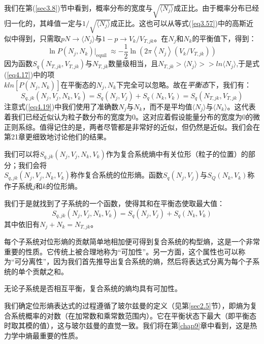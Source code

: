 \documentclass[UTF8]{ctexart}
\numberwithin{equation}{section}%
\numberwithin{figure}{section}%
\begin{document}
    我们在第(\ref{sec3.8})节中看到，概率分布的宽度与$\sqrt{\langle{N_j}\rangle}$成正比。由于概率分布已经归一化的，其峰值一定与$1/\sqrt{\langle{N_j}\rangle}$成正比。这也可以从等式(\ref{eq3.57})中的高斯近似中得到，只需取$pN\rightarrow\langle{N_j}\rangle$与$1-p\rightarrow V_k/V_{T,jk}$。在$N_j$和$N_k$的平衡值下，得到：
    \begin{equation}
        \ln P\left(N_{j}, N_{k}\right)|_{\text {equil }} \approx-\frac{1}{2} \ln \left(2 \pi\left\langle N_{j}\right\rangle\left(V_{k} / V_{T, j k}\right)\right)
    \end{equation}
    因为函数$S_q(N_{T,jk},V_{T,jk})$与$N_{T,jk}$数量级相当，且$N_{T,jk}>\langle{N_j}\rangle>>ln\langle{N_j}\rangle$,于是式(\ref{eq4.17})中的项\\$kln[P(N_j,N_k)]$在平衡态的$N_j,N_k$下完全可以忽略。故在\textit{平衡态}下，我们有：
    \begin{equation}\label{eq4.19}
        S_{q, j k}\left(N_{j}, V_{j}, N_{k}, V_{k}\right)=S_{q}\left(N_{j}, V_{j}\right)+S_{q}\left(N_{k}, V_{k}\right)=S_{q}\left(N_{T, j k}, V_{T, j k}\right)
    \end{equation}
    注意式(\ref{eq4.19})中我们使用了准确数$N_j$与$N_k$，而不是平均值$\langle{N_j}\rangle$与$\langle{N_k}\rangle$。这代表着我们已经近似认为粒子数分布的宽度为0。这对应着假设能量分布的宽度为0的微正则系综。值得记住的是，两者尽管都是非常好的近似，但仍然是近似。我们会在第21章更细致地讨论他们的结果。

    我们可以将$S_{q, j k}\left(N_{j}, V_{j}, N_{k}, V_{k}\right)$作为复合系统熵中有关位形（粒子的位置）的部分；我们会将\\$S_{q, j k}\left(N_{j}, V_{j}, N_{k}, V_{k}\right)$称作复合系统的位形熵。函数$S_q(N_j,V_j)$与$S_Q(N_k,V_k)$称作子系统$j$和$k$的位形熵。

    我们于是就找到了子系统的一个函数，使得其和在平衡态使取最大值：
    \begin{equation}
        S_{q, j k}\left(N_{j}, V_{j}, N_{k}, V_{k}\right)=S_{q}\left(N_{j}, V_{j}\right)+S_{q}\left(N_{k}, V_{k}\right)
    \end{equation}
    其中依旧有$N_j+N_k=N_{T,jk}$。

    每个子系统对位形熵的贡献简单地相加便可得到复合系统的构型熵，这是一个非常重要的性质。它传统上被合理地称为“可加性”。另一方面，这个属性也可以称为“可分离性”，因为我们首先推导出复合系统的熵，然后将表达式分离为每个子系统的单个贡献之和。

    无论子系统是否相互平衡，复合系统的熵均具有可加性。

    我们确定位形熵表达式的过程遵循了玻尔兹曼的定义（见第\ref{sec2.5}节），即熵为复合系统概率的对数（在加常数和乘常数范围内）。它在平衡状态下最大（即平衡态时取其模的值），这与玻尔兹曼的直觉一致。我们将在第\ref{chap9}章中看到，这是热力学中熵最重要的性质。
\end{document}
